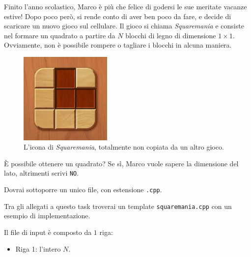 \usepackage{xcolor}
\usepackage{afterpage}
\usepackage{pifont,mdframed}
\usepackage[bottom]{footmisc}
\usepackage{minted}

\newcommand{\inputfile}{\texttt{stdin}}
\newcommand{\outputfile}{\texttt{stdout}}
\makeatletter
\renewcommand{\this@inputfilename}{\texttt{stdin}}
\renewcommand{\this@outputfilename}{\texttt{stdout}}
\renewcommand{\this@syllabuslevel}{5}
\renewcommand{\this@custdifficulty}{3}
\makeatother

Finito l'anno scolastico, Marco è più che felice di godersi le sue meritate vacanze estive!
Dopo poco però, si rende conto di aver ben poco da fare, e decide di scaricare un nuovo gioco sul cellulare.
Il gioco si chiama \textit{Squaremania} e consiste nel formare un quadrato a partire da
$N$ blocchi di legno di dimensione $1\times1$.
Ovviamente, non è possibile rompere o tagliare i blocchi in alcuna maniera.

\begin{figure}[h]
    \centering
    \includegraphics[width=0.4\textwidth]{./woodoku.jpg}
    \caption{L'icona di \textit{Squaremania}, totalmente non copiata da un altro gioco.}
\end{figure}

È possibile ottenere un quadrato? Se sì, Marco vuole sapere la dimensione del lato, altrimenti scrivi \texttt{NO}.


\Implementation

Dovrai sottoporre un unico file, con estensione \texttt{.cpp}.

\begin{warning}
    Tra gli allegati a questo task troverai un template \texttt{squaremania.cpp} con un esempio di implementazione.
\end{warning}

Il file di input è composto da $1$ riga:
\begin{itemize}
    \item Riga 1: l'intero $N$.
\end{itemize}

